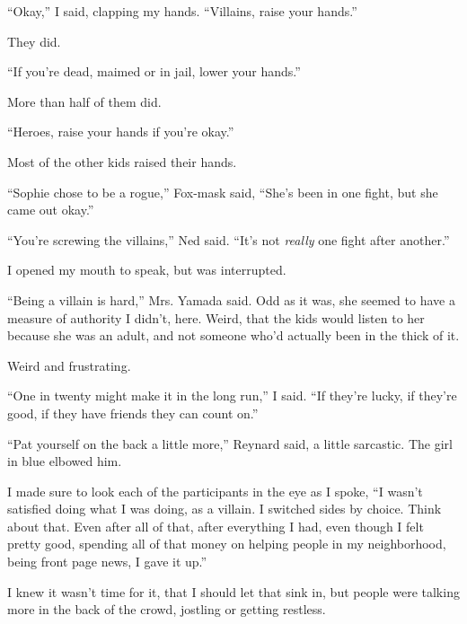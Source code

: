 ``Okay,'' I said, clapping my hands.  ``Villains, raise your hands.''



They did.



``If you're dead, maimed or in jail, lower your hands.''



More than half of them did.



``Heroes, raise your hands if you're okay.''



Most of the other kids raised their hands.



``Sophie chose to be a rogue,'' Fox-mask said, ``She's been in one fight, but she came out okay.''



``You're screwing the villains,'' Ned said.  ``It's not \emph{really} one fight after another.''



I opened my mouth to speak, but was interrupted.



``Being a villain is hard,'' Mrs. Yamada said.  Odd as it was, she seemed to have a measure of authority I didn't, here.  Weird, that the kids would listen to her because she was an adult, and not someone who'd actually been in the thick of it.



Weird and frustrating.



``One in twenty might make it in the long run,'' I said.  ``If they're lucky, if they're good, if they have friends they can count on.''



``Pat yourself on the back a little more,'' Reynard said, a little sarcastic.  The girl in blue elbowed him.



I made sure to look each of the participants in the eye as I spoke, ``I wasn't satisfied doing what I was doing, as a villain.  I switched sides by choice.  Think about that.  Even after all of that, after everything I had, even though I felt pretty good, spending all of that money on helping people in my neighborhood, being front page news, I gave it up.''



I knew it wasn't time for it, that I should let that sink in, but people were talking more in the back of the crowd, jostling or getting restless.



